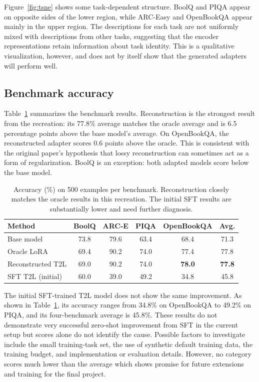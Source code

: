 \documentclass{article}
\begin{document}
Figure~\ref{fig:tsne} shows some task-dependent structure. BoolQ and PIQA appear on opposite sides of the lower region, while ARC-Easy and OpenBookQA appear mainly in the upper region. The descriptions for each task are not uniformly mixed with descriptions from other tasks, suggesting that the encoder representations retain information about task identity. This is a qualitative visualization, however, and does not by itself show that the generated adapters will perform well.

\subsection{Benchmark accuracy}
Table~\ref{tab:results} summarizes the benchmark results. Reconstruction is the strongest result from the recreation: its 77.8\% average matches the oracle average and is 6.5 percentage points above the base model's average. On OpenBookQA, the reconstructed adapter scores 0.6 points above the oracle. This is consistent with the original paper's hypothesis that lossy reconstruction can sometimes act as a form of regularization. BoolQ is an exception: both adapted models score below the base model.

\begin{table}[H]
  \centering
  \caption{Accuracy (\%) on 500 examples per benchmark. Reconstruction closely matches the oracle results in this recreation. The initial SFT results are substantially lower and need further diagnosis.}
  \label{tab:results}
  \begin{tabular}{lccccc}
    \toprule
    Method & BoolQ & ARC-E & PIQA & OpenBookQA & Avg. \\
    \midrule
    Base model & 73.8 & 79.6 & 63.4 & 68.4 & 71.3 \\
    Oracle LoRA & 69.4 & 90.2 & 74.0 & 77.4 & 77.8 \\
    Reconstructed T2L & 69.0 & 90.2 & 74.0 & \textbf{78.0} & \textbf{77.8} \\
    SFT T2L (initial) & 60.0 & 39.0 & 49.2 & 34.8 & 45.8 \\
    \bottomrule
  \end{tabular}
\end{table}

The initial SFT-trained T2L model does not show the same improvement. As shown in Table~\ref{tab:results}, its accuracy ranges from 34.8\% on OpenBookQA to 49.2\% on PIQA, and its four-benchmark average is 45.8\%. These results do not demonstrate very successful zero-shot improvement from SFT in the current setup but scores alone do not identify the cause. Possible factors to investigate include the small training-task set, the use of synthetic default training data, the training budget, and implementation or evaluation details. However, no category scores much lower than the average which shows promise for future extensions and training for the final project.
\end{document}
